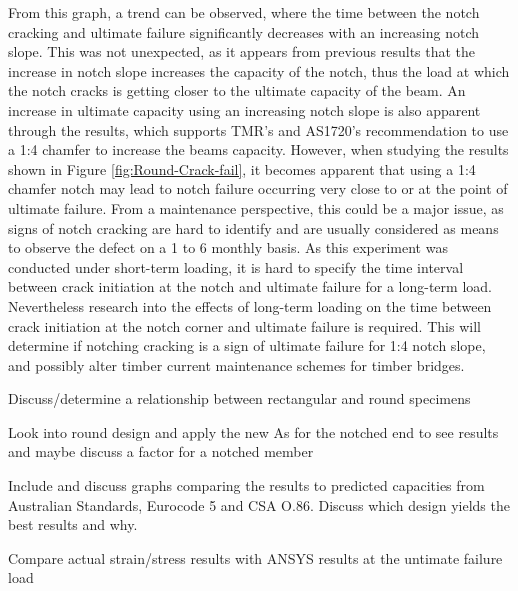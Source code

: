 \documentclass[11pt,a4paper]{article}
\numberwithin{equation}{subsection}
\begin{document}
From this graph, a trend can be observed, where the time between the notch cracking and ultimate failure significantly decreases with an increasing notch slope. This was not unexpected, as it appears from previous results that the increase in notch slope increases the capacity of the notch, thus the load at which the notch cracks is getting closer to the ultimate capacity of the beam. An increase in ultimate capacity using an increasing notch slope is also apparent through the results, which supports TMR's and AS1720's recommendation to use a 1:4 chamfer to increase the beams capacity. However, when studying the results shown in Figure \ref{fig:Round-Crack-fail}, it becomes apparent that using a 1:4 chamfer notch may lead to notch failure occurring very close to or at the point of ultimate failure. From a maintenance perspective, this could be a major issue, as signs of notch cracking are hard to identify and are usually considered as means to observe the defect on a 1 to 6 monthly basis. As this experiment was conducted under short-term loading, it is hard to specify the time interval between crack initiation at the notch and ultimate failure for a long-term load. Nevertheless research into the effects of long-term loading on the time between crack initiation at the notch corner and ultimate failure is required. This will determine if notching cracking is a sign of ultimate failure for 1:4 notch slope, and possibly alter timber current maintenance schemes for timber bridges.

\vspace*{\baselineskip}
\noindent Discuss/determine a relationship between rectangular and round specimens\par

\vspace*{\baselineskip}
\noindent Look into round design and apply the new As for the notched end to see results and maybe discuss a factor for a notched member\par

\vspace*{\baselineskip}
\noindent Include and discuss graphs comparing the results to predicted capacities from Australian Standards, Eurocode 5 and CSA O.86. Discuss which design yields the best results and why. \par

\vspace*{\baselineskip}
\noindent Compare actual strain/stress results with ANSYS results at the untimate failure load\par
\end{document}
